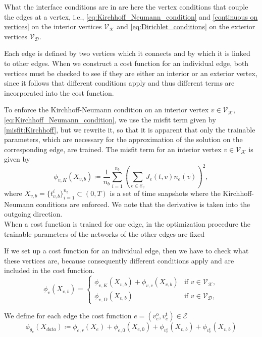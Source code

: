 What the interface conditions are in \cite{JagtapKharazmiKarniadakis:2020} are here the vertex conditions that couple the edges at a vertex, i.e., \cref{eq:Kirchhoff_Neumann_condition} and \cref{continuous on vertices} on the interior vertices $\mathcal{V}_\mathcal{K}$ and \cref{eq:Dirichlet_conditions} on the exterior vertices $\mathcal{V}_\mathcal{D}$. 

Each edge is defined by two vertices which it connects and by which it is linked to other edges. When we construct a cost function for an individual edge, both vertices must be checked to see if they are either an interior or an exterior vertex, since it follows that different conditions apply and thus different terms are incorporated into the cost function. 

To enforce the Kirchhoff-Neumann condition on an interior vertex $v \in \mathcal{V}_\mathcal{K}$, \cref{eq:Kirchhoff_Neumann_condition}, we use the misfit term given by \cref{misfit:Kirchhoff}, but we rewrite it, so that it is apparent that only the trainable parameters, which are necessary for the approximation of the solution on the corresponding edge, are trained. The misfit term for an interior vertex $v \in \mathcal{V}_\mathcal{K}$ is given by
\begin{equation} 
    \label{misfit:Kirchhoff.}
    \phi_{v,K}  \left( X_{v,b} \right) \coloneqq \frac{1}{n_b} \sum_{i=1}^{n_b}  \left( \sum_{e\in \mathcal{E}_v} J_e(t,v) n_e (v) \right)^2, 
\end{equation} 
where $X_{v,b} = \{t_{v,b}^i\}_{i=1}^{n_b} \subset \left( 0,T \right)$ is a set of time snapshots where the Kirchhoff-Neumann conditions are enforced. We note that the derivative is taken into the outgoing direction. \\

When a cost function is trained for one edge, in the optimization procedure the trainable parameters of the networks of the other edges are fixed



If we set up a cost function for an individual edge, then we have to check what these vertices are, because consequently different conditions apply and are included in the cost function. 
\begin{equation}
    \label{vertex funcions}
    \phi_{v}(X_{v,b}) = \begin{cases} \phi_{v,K}  \left( X_{v,b} \right) +  \phi_{v,c}  \left( X_{v,b} \right)& \text{if } v \in \mathcal{V}_{\mathcal{K}}, \\ \phi_{v,D}  \left( X_{v,b} \right) & \text{if } v \in \mathcal{V}_{\mathcal{D}}, \end{cases}
\end{equation}


We define for each edge the cost function $e = (v^{\operatorname{o}}_e, v^{\operatorname{t}}_e) \in \mathcal{E}$
\begin{equation}
    \label{eq:cost:2}
    \phi_{\theta_e} \left( X_{data} \right) \coloneqq \phi_{e,r}  \left( X_e \right) + \phi_{e,0}  \left( X_{e,0} \right) + \phi_{v^{\operatorname{o}}_e}(X_{v,b}) + \phi_{v^{\operatorname{t}}_e}(X_{v,b})
\end{equation}